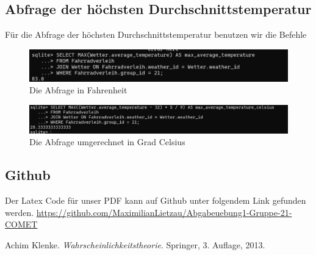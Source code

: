 \documentclass[a4paper,11pt]{article}
\begin{document}
\subsection{Abfrage der höchsten Durchschnittstemperatur}

Für die Abfrage der höchsten Durchschnittstemperatur benutzen wir die Befehle 

\begin{figure}[h]
\centering
\includegraphics[scale=.5]{Abfrage.png}
\caption{Die Abfrage in Fahrenheit}
\label{fig:meine-grafik3}
\end{figure}

\begin{figure}[h]
\centering
\includegraphics[scale=.4]{Abfrage Celsius.png}
\caption{Die Abfrage umgerechnet in Grad Celsius}
\label{fig:meine-grafik4}
\end{figure}

\subsection{Github}

Der Latex Code für unser PDF kann auf Github unter folgendem Link gefunden werden.
\url{https://github.com/MaximilianLietzau/Abgabeuebung1-Gruppe-21-COMET}

\begin{thebibliography}{9}
Achim Klenke. \textit{Wahrscheinlichkeitstheorie}. Springer, 3. Auflage, 2013.
\end{thebibliography}
\end{document}
